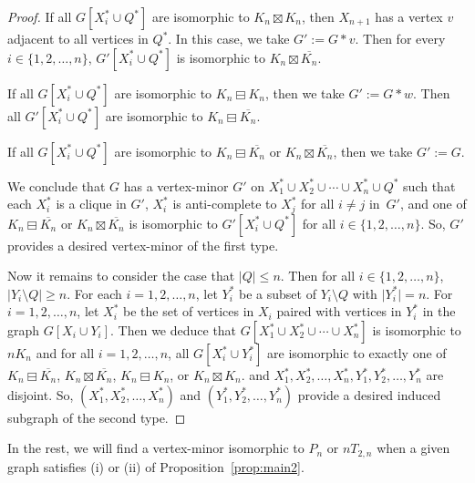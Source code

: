 \documentclass[11pt]{article}
\newcommand\abs[1]{\lvert #1\rvert}
\newcommand\mat{\boxminus}
\newcommand\antimat{\boxtimes}
\def\S_#1{\overline{K_{#1}}}
\begin{document}
\begin{proof}
        If all $G[X_i^*\cup Q^*]$ are isomorphic to $K_n\antimat K_n$,
        then
        $X_{n+1}$ has a vertex $v$ adjacent to all vertices in $Q^*$.
        In this case, we take $G':=G*v$. 
        Then for every $i\in \{1, 2, \ldots, n\}$, $G'[X_i^*\cup Q^*]$ is isomorphic to $K_n\antimat \S_n$.

        If all $G[X_i^*\cup Q^*]$ are isomorphic to $K_n\mat K_n$,
        then we take $G':=G*w$.
        Then all $G'[X_i^*\cup Q^*]$ are isomorphic to $K_n\mat \S_n$.
	
	If all $G[X_i^*\cup Q^*]$ are isomorphic to $K_n\mat \S_n$ or $K_n\antimat \S_n$, then
  we take $G':=G$. 
  
        We conclude that 
        $G$ has a vertex-minor $G'$ on $X_1^*\cup X_2^*\cup \cdots \cup X_n^*\cup Q^*$
        such that
        each $X_i^*$ is a clique in $G'$,
        $X_i^*$ is anti-complete to $X_j^*$  for all $i\neq j$ in~$G'$,
        and
        one of $K_n\mat \S_n$ or $K_n\antimat\S_n$
        is isomorphic to
        $G'[X_i^*\cup Q^*]$
        for all $i\in\{1,2,\ldots,n\}$.
        So, $G'$ provides a desired vertex-minor
        of the first type.

        Now it remains to consider the case that $\abs{Q}\le n$. Then
        for all $i\in\{1,2,\ldots,n\}$,
        $\abs{Y_i\setminus Q}\ge n$.
        For each $i=1,2,\ldots,n$,
        let $Y_i^*$ be a subset of $Y_i\setminus Q$ with $\abs{Y_i^*}=n$.
        For $i=1,2,\ldots,n$, let $X_i^*$ be the set of vertices in $X_i$
        paired with vertices in $Y_i^*$ in the graph $G[X_i\cup Y_i]$.
        Then we deduce that
        $G[X_1^*\cup X_2^*\cup \cdots \cup X_n^*]$ is isomorphic to $nK_n$
        and
        for all $i=1,2,\ldots,n$,
        all $G[X_i^*\cup Y_i^*]$ are isomorphic to
        exactly one of
        $K_n\mat \S_n$, $K_n\antimat\S_n$, $K_n\mat K_n$, or $K_n\antimat K_n$.
        and $X_1^*,X_2^*,\ldots,X_n^*,Y_1^*,Y_2^*,\ldots,Y_n^*$ are disjoint.
        So, $(X_1^*,X_2^*,\ldots,X_n^*)$ and $(Y_1^*,Y_2^*,\ldots,Y_n^*)$ provide a desired induced subgraph of the second type.
      \end{proof}
	
	

      In the rest, we will find a vertex-minor isomorphic to $P_n$ or $nT_{2,n}$ when a given graph satisfies (i) or (ii) of Proposition~\ref{prop:main2}.
      
	
\end{document}
